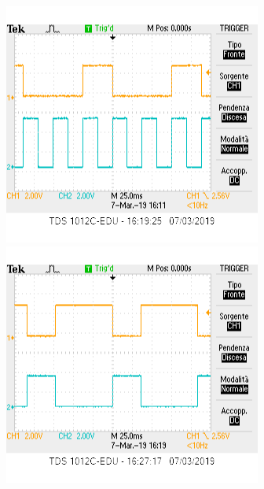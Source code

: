 \documentclass[10pt,a4paper]{article}
\begin{document}
\begin{figure}
\includegraphics[scale=0.7]{Red.png}
\includegraphics[scale=0.7]{GreenandRed.png}

\end{figure}
\end{document}
